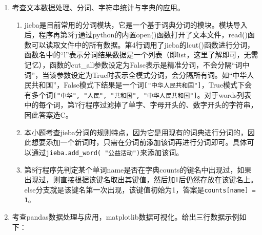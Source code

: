 \begin{enumerate}
\item 考查文本数据处理、分词、字符串统计与字典的应用。
	\begin{enumerate}[label=$(\arabic*)$]
\setcounter{qnumber}{1}
\begin{lstlisting}[numbers=left]
import jieba                                     # 导入jieba模块
import pandas as pd
text = open("news.txt", encoding="utf-8").read() # 打开文本文件
words = jieba.lcut(text, cut_all=False)          # 分词
counts = {}
for name in words:
    if len(name) != 1 and not ("a" < name[0] < "z") and not ("0" < name[0] < "9"):
        if name in counts:
            counts[name] += 1                    # 词语已出现过
        else:
            counts[name] = 1                     # 词语第一次出现
# 字典转化为DataFrame格式存储
df = pd.DataFrame(list(counts.items()), columns=["词", "次数"])
df = df.sort_values("次数", ascending=False)     # 按“次数”降序排序
print(df)
\end{lstlisting}
	\item jieba是目前常用的分词模块，它是一个基于词典分词的模块。模块导入后，程序再第3行通过python的内置open()函数打开了文本文件，read()函数可以读取文件中的所有数据。第4行调用了jieba的lcut()函数进行分词，函数名中的“l”表示分词结果数据是一个列表（即list，这里了解即可，无需记忆），函数的cut\_all参数设定为False表示是精准分词，不会分隔“词中词”，当该参数设定为True时表示全模式分词，会分隔所有词。如“中华人民共和国”，False模式下结果是一个词\lstinline|["中华人民共和国"]|，True模式下会有多个词\lstinline|["中华", "人民", "共和国", "中华人民共和国"]|。对于words列表中的每个词，第7行程序过滤掉了单字、字母开头的、数字开头的字符串，因此答案选C。
	\item 本小题考查jieba分词的规则特点，因为它是用现有的词典进行分词的，因此想要添加一个新词时，只需在分词前添加该词再进行分词即可。具体可以通过\lstinline|jieba.add_word( "公益活动")|来添加该词。
	\item 第8行程序先判定某个单词name是否在字典counts的键名中出现过，如果出现过，则直接根据该键名取出其键值，然后加1后仍然存放在该键名上。else分支就是该键名第一次出现，该键值初始为1，答案是\lstinline|counts[name] = 1|。
	\end{enumerate}


\item 考查pandas数据处理与应用，matplotlib数据可视化。给出三行数据示例如下：


\end{enumerate}
